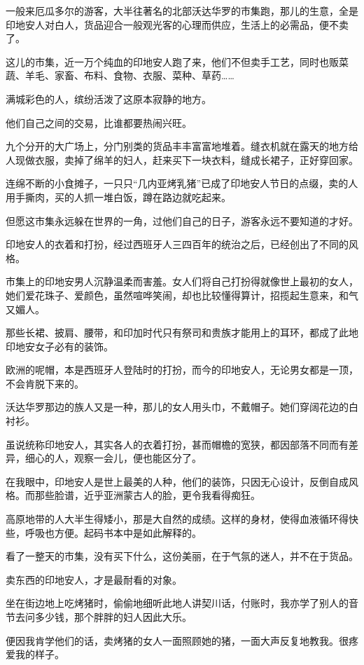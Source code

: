 \par 一般来厄瓜多尔的游客，大半往著名的北部沃达华罗的市集跑，那儿的生意，全是印地安人对白人，货品迎合一般观光客的心理而供应，生活上的必需品，便不卖了。
\par 这儿的市集，近一万个纯血的印地安人跑了来，他们不但卖手工艺，同时也贩菜蔬、羊毛、家畜、布料、食物、衣服、菜种、草药……
\par 满城彩色的人，缤纷活泼了这原本寂静的地方。
\par 他们自己之间的交易，比谁都要热闹兴旺。
\par 九个分开的大广场上，分门别类的货品丰丰富富地堆着。缝衣机就在露天的地方给人现做衣服，卖掉了绵羊的妇人，赶来买下一块衣料，缝成长裙子，正好穿回家。
\par 连绵不断的小食摊子，一只只“几内亚烤乳猪”已成了印地安人节日的点缀，卖的人用手撕肉，买的人抓一堆白饭，蹲在路边就吃起来。
\par 但愿这市集永远躲在世界的一角，过他们自己的日子，游客永远不要知道的才好。
\par 印地安人的衣着和打扮，经过西班牙人三四百年的统治之后，已经创出了不同的风格。
\par 市集上的印地安男人沉静温柔而害羞。女人们将自己打扮得就像世上最初的女人，她们爱花珠子、爱颜色，虽然喧哗笑闹，却也比较懂得算计，招揽起生意来，和气又媚人。
\par 那些长裙、披肩、腰带，和印加时代只有祭司和贵族才能用上的耳环，都成了此地印地安女子必有的装饰。
\par 欧洲的呢帽，本是西班牙人登陆时的打扮，而今的印地安人，无论男女都是一顶，不会肯脱下来的。
\par 沃达华罗那边的族人又是一种，那儿的女人用头巾，不戴帽子。她们穿阔花边的白衬衫。
\par 虽说统称印地安人，其实各人的衣着打扮，甚而帽檐的宽狭，都因部落不同而有差异，细心的人，观察一会儿，便也能区分了。
\par 在我眼中，印地安人是世上最美的人种，他们的装饰，只因无心设计，反倒自成风格。而那些脸谱，近乎亚洲蒙古人的脸，更令我看得痴狂。
\par 高原地带的人大半生得矮小，那是大自然的成绩。这样的身材，使得血液循环得快些，呼吸也方便。起码书本中是如此解释的。
\par 看了一整天的市集，没有买下什么，这份美丽，在于气氛的迷人，并不在于货品。
\par 卖东西的印地安人，才是最耐看的对象。
\par 坐在街边地上吃烤猪时，偷偷地细听此地人讲契川话，付账时，我亦学了别人的音节去问多少钱，那个胖胖的妇人因此大乐。
\par 便因我肯学他们的话，卖烤猪的女人一面照顾她的猪，一面大声反复地教我。很疼爱我的样子。
